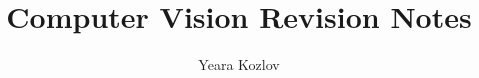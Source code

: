 \graphicspath{{cv_notebook}{cv_notebook/image_proc/}{cv_notebook/event_cameras/}{cv_notebook/cv/}}




\title{Computer Vision Revision Notes}
\author{Yeara Kozlov}
\date{}

\maketitle

\tableofcontents
\cleardoublepage








